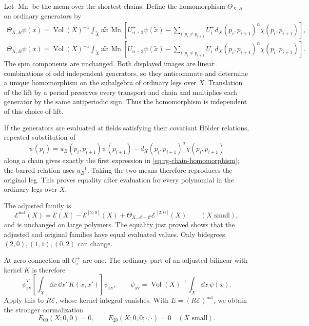 Let $\operatorname{Mn}$ be the mean over the shortest chains.
Define the homomorphism $\Theta_{X,B}$ on ordinary generators by
\begin{equation}\label{eq:rg-chain-homomorphism}
 \begin{split}
 \Theta_{X,B}\psi(x)
  =\operatorname{Vol}(X)^{-1}\int_{\widetilde X}\dd\tilde x\,
    \operatorname{Mn}\left[
       U_{n+2}^+\psi(\tilde x)
       -\sum_{i:p_i\ne p_{i+1}}
           U_i^+d_X(p_i,p_{i+1})^\alpha\chi(p_i,p_{i+1})\right],\\
 \Theta_{X,B}\bar\psi(x)
  =\operatorname{Vol}(X)^{-1}\int_{\widetilde X}\dd\tilde x\,
    \operatorname{Mn}\left[
       U_{n+2}^-\bar\psi(\tilde x)
       -\sum_{i:p_i\ne p_{i+1}}
           U_i^-d_X(p_i,p_{i+1})^\alpha\bar\chi(p_i,p_{i+1})\right].
 \end{split}
\end{equation}
The spin components are unchanged. Both displayed images are
linear combinations of odd independent generators, so they
anticommute and determine a unique homomorphism on the
subalgebra of ordinary legs over $X$. Translation of the lift
by a period preserves every transport and chain and multiplies
each generator by the same antiperiodic sign. Thus the
homomorphism is independent of this choice of lift.

If the generators are evaluated at fields satisfying their
covariant H\"older relations, repeated substitution of
\[
 \psi(p_i)=u_B(p_i,p_{i+1})\psi(p_{i+1})
                    -d_X(p_i,p_{i+1})^\alpha\chi(p_i,p_{i+1})
\]
along a chain gives exactly the first expression in
\eqref{eq:rg-chain-homomorphism}; the barred relation uses
$u_B^{-1}$. Taking the two means therefore reproduces the
original leg. This proves equality after evaluation for
every polynomial in the ordinary legs over $X$.

The adjusted family is
\begin{equation}\label{eq:rg-adjustment-definition}
 \mathscr E^{\mathrm{nat}}(X)
   =\mathscr E(X)-\mathscr E^{[2,0]}(X)
           +\Theta_{X,\mathscr A+\mathscr C}
                                      \mathscr E^{[2,0]}(X)
                                      \qquad(X\text{ small}),
\end{equation}
and is unchanged on large polymers. The equality just proved
shows that the adjusted and original families have equal
evaluated values. Only bidegrees $(2,0),(1,1),(0,2)$ can change.

At zero connection all $U_i^\pm$ are one. The ordinary part
of an adjusted bilinear with kernel $K$ is therefore
\[
 \bar\psi_{\mathrm{av}}^T
    \left[\int_{\widetilde X}\dd x\,\dd x'\,K(x,x')\right]
                                                     \psi_{\mathrm{av}},
 \qquad
 \psi_{\mathrm{av}}=\operatorname{Vol}(X)^{-1}
                                        \int_{\widetilde X}\dd x\,\psi(x).
\]
Apply this to $R\mathscr E$, whose kernel integral vanishes.
With $E=(R\mathscr E)^{\mathrm{nat}}$, we obtain the stronger
normalization
\begin{equation}\label{eq:rg-adjusted-kernel-normalization}
 E_{00}(X;0,0)=0,\qquad E_{20}(X;0,0;\cdot,\cdot)=0
                                                     \quad(X\text{ small}).
\end{equation}

